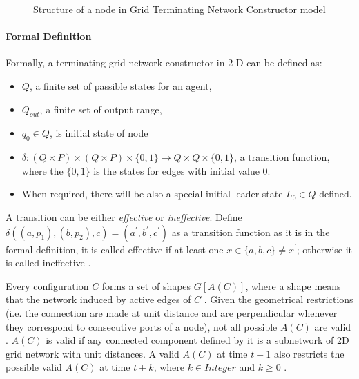\par\noindent
\begin{figure}[H]
\begin{center}
\end{center}
\caption{Structure of a node in Grid Terminating Network Constructor model}
\end{figure}


\par\noindent
\paragraph{Formal Definition \cite{Mi17} }
Formally, a terminating grid network constructor in 2-D can be defined as:
\begin{itemize}
  \item $Q$, a finite set of passible states for an agent,
  \item $Q_{out}$, a finite set of output range,
  \item $q_{0} \in Q $, is initial state of node
  \item $\delta: (Q \times P ) \times (Q \times P) \times \{0,1\} \to Q \times Q \times \{0,1\}$, a transition function, where the $\{0,1\}$ is the states for edges with initial value 0.
  \item When required, there will be also a special initial leader-state $L_{0} \in Q $ defined.
\end{itemize}

\par\noindent
A transition can be either \textit{effective}
or \textit{ineffective}. Define $\delta((a, p_{1}), (b, p_{2}), c) = (a^{'}, b^{'},c^{'})$ as a transition function
as it is in the formal definition, it is called effective if at least one $x \in \{a,b,c\} \not= x^{'} $; otherwise it is called ineffective \cite{Mi17}.


\par\noindent
Every configuration $C$ forms a set of shapes $G[A(C)]$, where a shape means that the network induced
by active edges of $C$ \cite{Mi17}. Given the geometrical restrictions (i.e. the connection are
made at unit distance and are perpendicular whenever they correspond to consecutive ports of a node),
not all possible $A(C)$ are valid \cite{Mi17}. $A(C)$ is valid if any connected component defined by it is a
subnetwork of 2D grid network with unit distances. A valid $A(C)$ at time $t -1$ also restricts the
possible valid $A(C)$ at time $t + k$, where $k \in Integer$ and $k \geq 0 $ \cite{Mi17}.


